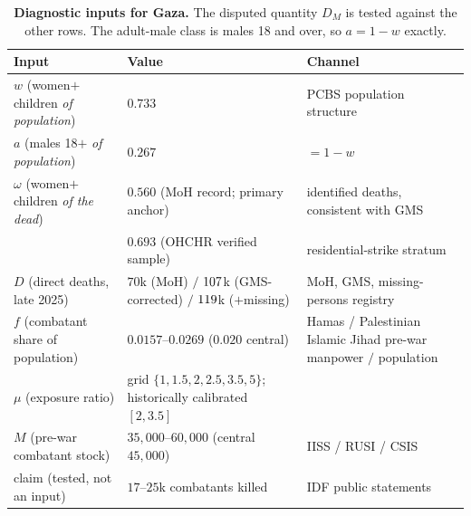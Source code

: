 \begin{table}[ht]
\centering
\caption{\textbf{Diagnostic inputs for Gaza.} The disputed quantity $D_M$ is tested against the other rows. The adult-male class is males 18 and over, so $a=1-w$ exactly.}
\label{tab:gaza-inputs}
\begin{small}
\renewcommand{\arraystretch}{1.3}
\begin{tabularx}{\textwidth}{@{}>{\raggedright\arraybackslash}p{}>{\raggedright\arraybackslash}X>{\raggedright\arraybackslash}X@{}}
\toprule
Input & Value & Channel \\
\midrule
$w$ (women$+$children \emph{of population}) & $0.733$       & PCBS population structure \\
$a$ (males 18$+$ \emph{of population})      & $0.267$       & $=1-w$ \\
\addlinespace
$\omega$ (women$+$children \emph{of the dead}) & $0.560$ (MoH record; primary anchor) & identified deaths, consistent with GMS \\
          & $0.693$ (OHCHR verified sample)  & residential-strike stratum \\
\addlinespace
$D$ (direct deaths, late 2025) & $70$k (MoH) $/$ $107{}$k (GMS-corrected) $/$ $119{}$k ($+$missing) & MoH, GMS, missing-persons registry \\
$f$ (combatant share of population) & $0.0157$--$0.0269$ ($0.020$ central) & Hamas / Palestinian Islamic Jihad pre-war manpower $/$ population \\
$\mu$ (exposure ratio) & grid $\{1,1.5,2,2.5,3.5,5\}$; historically calibrated $[2,3.5]$ & \citet{frost2026,cockerill2024} \\
$M$ (pre-war combatant stock) & $35{,}000$--$60{,}000$ (central $45{,}000$) & IISS / RUSI / CSIS \\
\midrule
claim (tested, not an input) & $17$--$25$k combatants killed & IDF public statements \\
\bottomrule
\end{tabularx}
\end{small}
\end{table}

